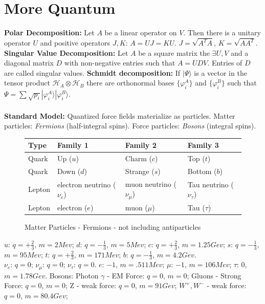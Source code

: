 \section{More Quantum}
{\bf Polar Decomposition:} Let $A$ be a linear operator on $V$.  Then there is a
unitary operator $U$ and positive operators $J, K$: $A=UJ=KU$.  
$J={\sqrt {A^TA}}$,
$K={\sqrt {AA^T}}$.
{\bf Singular Value Decomposition:} Let $A$ be a square matrix the $\exists U, V$ and a diagonal
matrix $D$ with non-negative entries such that $A=UDV$.  Entries of $D$ are called singular values.
{\bf Schmidt decomposition:}  If $|\Psi \rangle $ is a 
vector in the tensor product ${\mathcal H}_A \otimes {\mathcal H}_B$ there are orthonormal bases 
$\{ \varphi_i^A \}$ and
$\{ \varphi_i^B \}$ such that $\Psi= \sum {\sqrt {p_i}} |\varphi_i^A \rangle |\varphi_i^B \rangle$.
\\
\\
{\bf Standard Model:} Quantized force fields materialize as particles.
Matter particles: \emph{Fermions} (half-integral spins).  Force particles: 
\emph{Bosons} (integral spins).
\begin{figure}[h]
\begin{center}
\begin{tabular} {|l||l|l|l|}
\hline
Type & Family 1 & Family 2 & Family 3\\
\hline
Quark  & Up ($u$) & Charm ($c$) & Top ($t$)\\
Quark & Down ($d$) & Strange ($s$) & Bottom ($b$)\\
\hline
Lepton & electron neutrino ($\nu_e$) & muon neutrino ($\nu_{\mu}$) & Tau neutrino ($\nu_{\tau}$)\\
Lepton & electron ($e$) & muon ($\mu$) & Tau ($\tau$)\\
\hline
\end{tabular}
\end{center}
\caption{Matter Particles - Fermions - not including antiparticles}
\end{figure}
$u$: $q= +{\frac 2 3}$, $m= 2 Mev$;
$d$: $q= -{\frac 1 3}$, $m= 5 Mev$;
$c$: $q= +{\frac 2 3}$, $m= 1.25 Gev$;
$s$: $q= -{\frac 1 3}$, $m= 95 Mev$;
$t$: $q= +{\frac 2 3}$, $m= 171 Mev$;
$b$: $q= -{\frac 1 3}$, $m= 4.2 Gev$.
\\
$\nu_e$: $q= 0$;
$\nu_{\mu}$: $q= 0$;
$\nu_{\tau}$: $q= 0$.
$e$: $-1$, $m=.511 Mev$;
$\mu$: $-1$, $m=106 Mev$;
$\tau$: $0$, $m= 1.78 Gev$.
Bosons: 
Photon $\gamma$ - EM Force: $q=0$, $m=0$; 
Gluons - Strong Force: $q=0$, $m=0$; 
Z - weak force: $q=0$, $m=91 Gev$; 
$W^+, W^-$ - weak force: $q=0$, $m=80.4 Gev$; 
